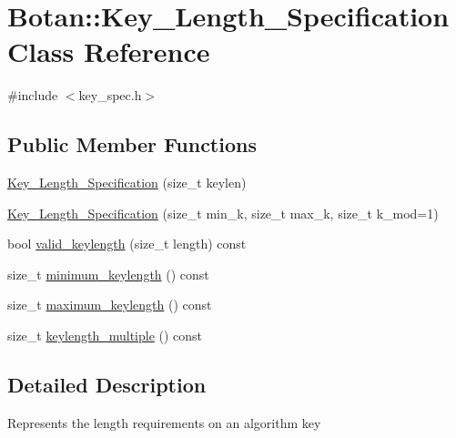 \hypertarget{classBotan_1_1Key__Length__Specification}{\section{Botan\-:\-:Key\-\_\-\-Length\-\_\-\-Specification Class Reference}
\label{classBotan_1_1Key__Length__Specification}
}


{\ttfamily \#include $<$key\-\_\-spec.\-h$>$}

\subsection*{Public Member Functions}
\begin{DoxyCompactItemize}
\item 
\hyperlink{classBotan_1_1Key__Length__Specification_a00f3f1f47f839368149d98d876ebcd8f}{Key\-\_\-\-Length\-\_\-\-Specification} (size\-\_\-t keylen)
\item 
\hyperlink{classBotan_1_1Key__Length__Specification_a06b458b450a9b16c100cfed800a59d73}{Key\-\_\-\-Length\-\_\-\-Specification} (size\-\_\-t min\-\_\-k, size\-\_\-t max\-\_\-k, size\-\_\-t k\-\_\-mod=1)
\item 
bool \hyperlink{classBotan_1_1Key__Length__Specification_a23a79e5eb3ebeec4eafb56e7a50d9d6f}{valid\-\_\-keylength} (size\-\_\-t length) const 
\item 
size\-\_\-t \hyperlink{classBotan_1_1Key__Length__Specification_a492ebec5a2ea22bd81f74bbad1b56014}{minimum\-\_\-keylength} () const 
\item 
size\-\_\-t \hyperlink{classBotan_1_1Key__Length__Specification_a2526da7b3bf42bb723e192bd481c1326}{maximum\-\_\-keylength} () const 
\item 
size\-\_\-t \hyperlink{classBotan_1_1Key__Length__Specification_a5e3b8f7945a9e4d0e2b1bfa483388ff9}{keylength\-\_\-multiple} () const 
\end{DoxyCompactItemize}


\subsection{Detailed Description}
Represents the length requirements on an algorithm key 


